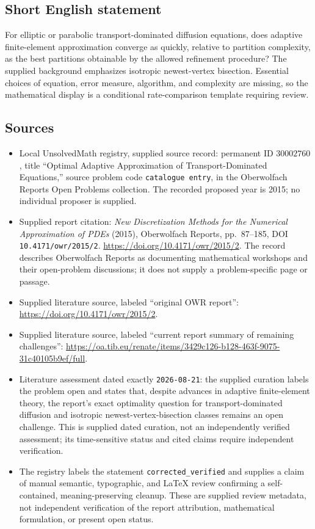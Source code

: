 \documentclass[11pt]{article}
\begin{document}
\subsection{Short English statement}
For elliptic or parabolic transport-dominated diffusion equations, does adaptive finite-element approximation converge as quickly, relative to partition complexity, as the best partitions obtainable by the allowed refinement procedure? The supplied background emphasizes isotropic newest-vertex bisection. Essential choices of equation, error measure, algorithm, and complexity are missing, so the mathematical display is a conditional rate-comparison template requiring review.
\subsection{Sources}
\begin{itemize}
\item Local UnsolvedMath registry, supplied source record: permanent ID \(30002760\), title ``Optimal Adaptive Approximation of Transport-Dominated Equations,'' source problem code \texttt{catalogue entry}, in the Oberwolfach Reports Open Problems collection. The recorded proposed year is 2015; no individual proposer is supplied.
\item Supplied report citation: \emph{New Discretization Methods for the Numerical Approximation of PDEs} (2015), Oberwolfach Reports, pp.~87--185, DOI \texttt{10.4171/owr/2015/2}. \url{https://doi.org/10.4171/owr/2015/2}. The record describes Oberwolfach Reports as documenting mathematical workshops and their open-problem discussions; it does not supply a problem-specific page or passage.
\item Supplied literature source, labeled ``original OWR report'': \url{https://doi.org/10.4171/owr/2015/2}.
\item Supplied literature source, labeled ``current report summary of remaining challenges'': \url{https://oa.tib.eu/renate/items/3429c126-b128-463f-9075-31c40105b9ef/full}.
\item Literature assessment dated exactly \texttt{2026-08-21}: the supplied curation labels the problem open and states that, despite advances in adaptive finite-element theory, the report's exact optimality question for transport-dominated diffusion and isotropic newest-vertex-bisection classes remains an open challenge. This is supplied dated curation, not an independently verified assessment; its time-sensitive status and cited claims require independent verification.
\item The registry labels the statement \texttt{corrected\_verified} and supplies a claim of manual semantic, typographic, and LaTeX review confirming a self-contained, meaning-preserving cleanup. These are supplied review metadata, not independent verification of the report attribution, mathematical formulation, or present open status.
\end{itemize}
\end{document}
